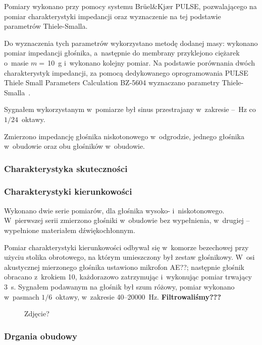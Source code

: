 \documentclass[12pt]{oska}
\begin{document}
			Pomiary wykonano przy pomocy systemu Brüel\&Kjær PULSE, pozwalającego na pomiar charakterystyki impedancji oraz wyznaczenie na tej podstawie parametrów Thiele-Smalla.
			
			Do wyznaczenia tych parametrów wykorzystano metodę dodanej masy: wykonano pomiar impedancji głośnika, a~następnie do membrany przyklejono ciężarek o~masie $m=\,$\SI{10}{\gram} i~wykonano kolejny pomiar. Na podstawie porównania dwóch charakterystyk impedancji, za pomocą dedykowanego oprogramowania PULSE Thiele Small Parameters Calculation BZ-5604 wyznaczano parametry Thiele-Smalla~\cite{BK_pulse_TS}.
			
			Sygnałem wykorzystanym w~pomiarze był sinus przestrajany w~zakresie \num{}--\num{}~\si{\Hz} co $1/24$~oktawy.
			
			Zmierzono impedancję głośnika niskotonowego w~odgrodzie, jednego głośnika w~obudowie oraz obu głośników w~obudowie.
			
		\subsubsection{Charakterystyka skuteczności}
			
			
			
		\subsubsection{Charakterystyki kierunkowości}
			
			Wykonano dwie serie pomiarów, dla głośnika wysoko- i~niskotonowego. W~pierwszej serii zmierzono głośniki w~obudowie bez wypełnienia, w~drugiej -- wypełnione materiałem dźwiękochłonnym.
			
			Pomiar charakterystyki kierunkowości odbywał się w~komorze bezechowej przy użyciu stolika obrotowego, na którym umieszczony był zestaw głośnikowy. W~osi akustycznej mierzonego głośnika ustawiono mikrofon AE??; następnie głośnik obracano z~krokiem \SI{10}{\deg}, każdorazowo zatrzymując i~wykonując pomiar trwający \SI{3}{\s}. Sygnałem podawanym na głośnik był szum różowy, pomiar wykonano w~pasmach $1/6$~oktawy, w~zakresie \num{40}--\num{20000}~\si{\Hz}. \color{red} \textbf{Filtrowaliśmy???}\color{black}
			
			\begin{figure}[h!]
				\centering
				\caption{Zdjęcie?}
				\label{r:zdjecie_kier}
			\end{figure}

			
		\subsubsection{Drgania obudowy}
			
\end{document}
